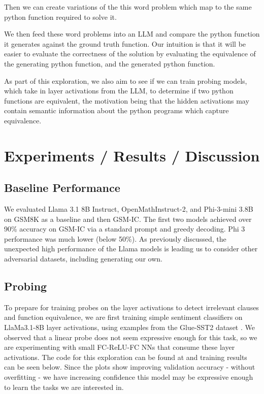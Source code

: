 \documentclass{article}
\begin{document}
Then we can create variations of the this word problem which map to the same python function required to solve it.

We then feed these word problems into an LLM and compare the python function it generates against the ground truth function. Our intuition is that it will be easier to evaluate the correctness of the solution by evaluating the equivalence of the generating python function, and the generated python function. 

As part of this exploration, we also aim to see if we can train probing models, which take in layer activations from the LLM, to determine if two python functions are equivalent, the motivation being that the hidden activations may contain semantic information about the python programs which capture equivalence. 

\section{Experiments / Results / Discussion}

\subsection{Baseline Performance}
We evaluated Llama 3.1 8B Instruct, OpenMathInstruct-2, and Phi-3-mini 3.8B on GSM8K as a baseline and then GSM-IC. The first two models achieved over 90\% accuracy on GSM-IC via a standard prompt and greedy decoding. Phi 3 performance was much lower (below 50\%). As previously discussed, the unexpected high performance of the Llama models is leading us to consider other adversarial datasets, including generating our own.

\subsection{Probing}
To prepare for training probes on the layer activations to detect irrelevant clauses and function equivalence, we are first training simple sentiment classifiers on LlaMa3.1-8B layer activations, using examples from the Glue-SST2 dataset \citep{wang2018glue}. We observed that a linear probe does not seem expressive enough for this task, so we are experimenting with small FC-ReLU-FC NNs that consume these layer activations. The code for this exploration can be found at \citep{skzv2024mathlm} and training results can be seen below. Since the plots show improving validation accuracy - without overfitting -  we have increasing confidence this model may be expressive enough to learn the tasks we are interested in. 
\end{document}
